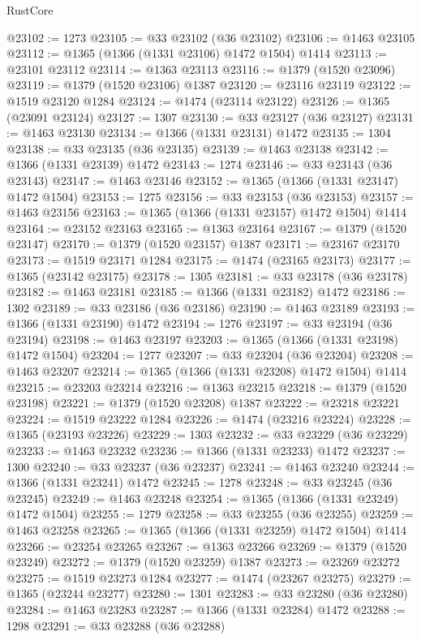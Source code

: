 \begin{lexlean}{RustCore}
\begin{coremodule}
@23102 := 1273
@23105 := @33 @23102 (@36 @23102)
@23106 := @1463 @23105
@23112 := @1365 (@1366 (@1331 @23106) @1472 @1504) @1414
@23113 := @23101 @23112
@23114 := @1363 @23113
@23116 := @1379 (@1520 @23096)
@23119 := @1379 (@1520 @23106) @1387
@23120 := @23116 @23119
@23122 := @1519 @23120 @1284
@23124 := @1474 (@23114 @23122)
@23126 := @1365 (@23091 @23124)
@23127 := 1307
@23130 := @33 @23127 (@36 @23127)
@23131 := @1463 @23130
@23134 := @1366 (@1331 @23131) @1472
@23135 := 1304
@23138 := @33 @23135 (@36 @23135)
@23139 := @1463 @23138
@23142 := @1366 (@1331 @23139) @1472
@23143 := 1274
@23146 := @33 @23143 (@36 @23143)
@23147 := @1463 @23146
@23152 := @1365 (@1366 (@1331 @23147) @1472 @1504)
@23153 := 1275
@23156 := @33 @23153 (@36 @23153)
@23157 := @1463 @23156
@23163 := @1365 (@1366 (@1331 @23157) @1472 @1504) @1414
@23164 := @23152 @23163
@23165 := @1363 @23164
@23167 := @1379 (@1520 @23147)
@23170 := @1379 (@1520 @23157) @1387
@23171 := @23167 @23170
@23173 := @1519 @23171 @1284
@23175 := @1474 (@23165 @23173)
@23177 := @1365 (@23142 @23175)
@23178 := 1305
@23181 := @33 @23178 (@36 @23178)
@23182 := @1463 @23181
@23185 := @1366 (@1331 @23182) @1472
@23186 := 1302
@23189 := @33 @23186 (@36 @23186)
@23190 := @1463 @23189
@23193 := @1366 (@1331 @23190) @1472
@23194 := 1276
@23197 := @33 @23194 (@36 @23194)
@23198 := @1463 @23197
@23203 := @1365 (@1366 (@1331 @23198) @1472 @1504)
@23204 := 1277
@23207 := @33 @23204 (@36 @23204)
@23208 := @1463 @23207
@23214 := @1365 (@1366 (@1331 @23208) @1472 @1504) @1414
@23215 := @23203 @23214
@23216 := @1363 @23215
@23218 := @1379 (@1520 @23198)
@23221 := @1379 (@1520 @23208) @1387
@23222 := @23218 @23221
@23224 := @1519 @23222 @1284
@23226 := @1474 (@23216 @23224)
@23228 := @1365 (@23193 @23226)
@23229 := 1303
@23232 := @33 @23229 (@36 @23229)
@23233 := @1463 @23232
@23236 := @1366 (@1331 @23233) @1472
@23237 := 1300
@23240 := @33 @23237 (@36 @23237)
@23241 := @1463 @23240
@23244 := @1366 (@1331 @23241) @1472
@23245 := 1278
@23248 := @33 @23245 (@36 @23245)
@23249 := @1463 @23248
@23254 := @1365 (@1366 (@1331 @23249) @1472 @1504)
@23255 := 1279
@23258 := @33 @23255 (@36 @23255)
@23259 := @1463 @23258
@23265 := @1365 (@1366 (@1331 @23259) @1472 @1504) @1414
@23266 := @23254 @23265
@23267 := @1363 @23266
@23269 := @1379 (@1520 @23249)
@23272 := @1379 (@1520 @23259) @1387
@23273 := @23269 @23272
@23275 := @1519 @23273 @1284
@23277 := @1474 (@23267 @23275)
@23279 := @1365 (@23244 @23277)
@23280 := 1301
@23283 := @33 @23280 (@36 @23280)
@23284 := @1463 @23283
@23287 := @1366 (@1331 @23284) @1472
@23288 := 1298
@23291 := @33 @23288 (@36 @23288)

\end{coremodule}
\end{lexlean}

